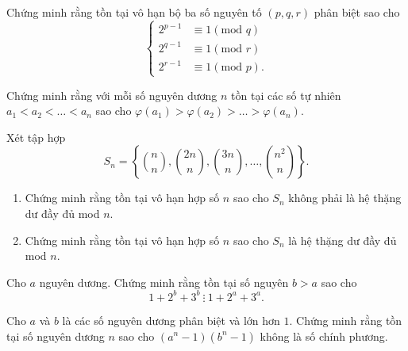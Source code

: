 \begin{bt}%
	Chứng minh rằng tồn tại vô hạn bộ ba số nguyên tố $(p,q,r)$ phân biệt sao cho 
	$$ \begin{cases}
	2^{p-1} & \equiv 1 (\text{mod }q) \\ 
	2^{q-1} & \equiv 1 (\text{mod }r) \\
	2^{r-1} & \equiv 1 (\text{mod }p). 
	\end{cases} $$
\end{bt}

\begin{bt}[Iran MO 2012]%
	Chứng minh rằng với mỗi số nguyên dương $n$ tồn tại các số tự nhiên $a_1 < a_2 < \ldots <a_n$ sao cho $\varphi (a_1) > \varphi (a_2) > \ldots > \varphi (a_n)$.
\end{bt}

\begin{bt}[Serbian MO 2013]%
	Xét tập hợp $$S_n = \left\{ \binom{n}{n} , \binom{2n}{n}, \binom{3n}{n}, \ldots , \binom{n^2}{n} \right\}.$$
	\begin{enumerate}
		\item Chứng minh rằng tồn tại vô hạn hợp số $n$ sao cho $S_n$ không phải là hệ thặng dư đầy đủ mod $n$.
		\item Chứng minh rằng tồn tại vô hạn hợp số $n$ sao cho $S_n$ là hệ thặng dư đầy đủ mod $n$.
	\end{enumerate}
\end{bt}

\begin{bt}%
	Cho $a$ nguyên dương. Chứng minh rằng tồn tại số nguyên $b>a$ sao cho $$1+2^b +3^b \ \vdots \ 1+2^a +3^a. $$
\end{bt}

\begin{bt}%
	Cho $a$ và $b$ là các số nguyên dương phân biệt và lớn hơn $1$. Chứng minh rằng tồn tại số nguyên dương $n$ sao cho $\left(a^n -1\right) \left(b^n -1\right)$ không là số chính phương.
\end{bt}

